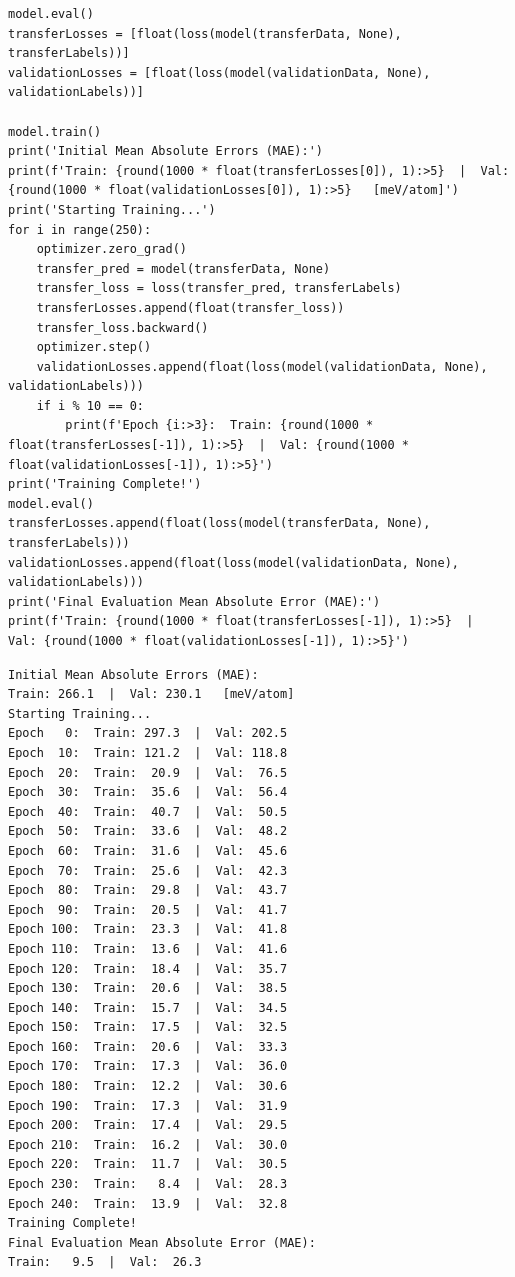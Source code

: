 \begin{verbatim}
model.eval()
transferLosses = [float(loss(model(transferData, None), transferLabels))]
validationLosses = [float(loss(model(validationData, None), validationLabels))]

model.train()
print('Initial Mean Absolute Errors (MAE):')
print(f'Train: {round(1000 * float(transferLosses[0]), 1):>5}  |  Val: {round(1000 * float(validationLosses[0]), 1):>5}   [meV/atom]')
print('Starting Training...')
for i in range(250):
    optimizer.zero_grad()
    transfer_pred = model(transferData, None)
    transfer_loss = loss(transfer_pred, transferLabels)
    transferLosses.append(float(transfer_loss))
    transfer_loss.backward()
    optimizer.step()
    validationLosses.append(float(loss(model(validationData, None), validationLabels)))
    if i % 10 == 0:
        print(f'Epoch {i:>3}:  Train: {round(1000 * float(transferLosses[-1]), 1):>5}  |  Val: {round(1000 * float(validationLosses[-1]), 1):>5}')
print('Training Complete!')
model.eval()
transferLosses.append(float(loss(model(transferData, None), transferLabels)))
validationLosses.append(float(loss(model(validationData, None), validationLabels)))
print('Final Evaluation Mean Absolute Error (MAE):')
print(f'Train: {round(1000 * float(transferLosses[-1]), 1):>5}  |  Val: {round(1000 * float(validationLosses[-1]), 1):>5}')
\end{verbatim}

\begin{verbatim}
Initial Mean Absolute Errors (MAE):
Train: 266.1  |  Val: 230.1   [meV/atom]
Starting Training...
Epoch   0:  Train: 297.3  |  Val: 202.5
Epoch  10:  Train: 121.2  |  Val: 118.8
Epoch  20:  Train:  20.9  |  Val:  76.5
Epoch  30:  Train:  35.6  |  Val:  56.4
Epoch  40:  Train:  40.7  |  Val:  50.5
Epoch  50:  Train:  33.6  |  Val:  48.2
Epoch  60:  Train:  31.6  |  Val:  45.6
Epoch  70:  Train:  25.6  |  Val:  42.3
Epoch  80:  Train:  29.8  |  Val:  43.7
Epoch  90:  Train:  20.5  |  Val:  41.7
Epoch 100:  Train:  23.3  |  Val:  41.8
Epoch 110:  Train:  13.6  |  Val:  41.6
Epoch 120:  Train:  18.4  |  Val:  35.7
Epoch 130:  Train:  20.6  |  Val:  38.5
Epoch 140:  Train:  15.7  |  Val:  34.5
Epoch 150:  Train:  17.5  |  Val:  32.5
Epoch 160:  Train:  20.6  |  Val:  33.3
Epoch 170:  Train:  17.3  |  Val:  36.0
Epoch 180:  Train:  12.2  |  Val:  30.6
Epoch 190:  Train:  17.3  |  Val:  31.9
Epoch 200:  Train:  17.4  |  Val:  29.5
Epoch 210:  Train:  16.2  |  Val:  30.0
Epoch 220:  Train:  11.7  |  Val:  30.5
Epoch 230:  Train:   8.4  |  Val:  28.3
Epoch 240:  Train:  13.9  |  Val:  32.8
Training Complete!
Final Evaluation Mean Absolute Error (MAE):
Train:   9.5  |  Val:  26.3
\end{verbatim}

